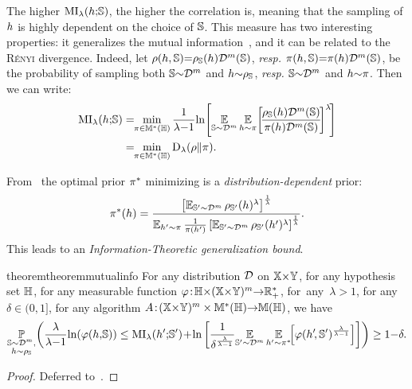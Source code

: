 \begin{noaddcontents}
The higher $\MI_{\lambda}(\h{;}\S)$, the higher the correlation is, meaning that the sampling of $\h$ is highly dependent on the choice of $\S$. 
This measure has two interesting properties: it generalizes the mutual information~\citep{Verdu2015}, and it can be related to the \textsc{Rényi} divergence.
Indeed, let $\rho(\h, \S){=} \AQ(\h)\D^{\m}(\S)$, \textit{resp.} $\pi(\h, \S){=} \P(\h)\D^{\m}(\S)$, be the probability of sampling both  $\S{\sim}\D^\m$ and  $\h{\sim}\AQ$, \textit{resp.}  $\S{\sim}\D^\m$ and $\h{\sim}\P$.
Then we can write: 
\begin{align}
\MI_{\lambda}(\h{;}\S) 
 &=\!\!\min_{\P\in\M^{*}(\H)} \frac{1}{\lambda{-}1}\!\ln\!\Bigg[\!\EE_{\S\sim\D^{\m}}\EE_{\h\sim \P}\!\LB\!\frac{\AQ(\h)\D^{\m}(\S)}{\P(\h)\D^{\m}(\S)}\!\RB^{\lambda}\!\!\Bigg]\nonumber\\
 &=\!\!\min_{\P\in\M^{*}(\H)} \Renyi_{\lambda}(\rho\|\pi).\label{chap:dis-pra:eq:mutual-info-min}
\end{align}

From~\citet{Verdu2015} the 
optimal prior $\P^*$ minimizing  is  a {\it distribution-dependent} prior: 
\begin{align*}
\displaystyle \P^*(\h)=\frac{\LB\EE_{\S'{\sim}\D^{\m}}\AQp (\h)^{\lambda}\RB^{\frac{1}{\lambda}}}{\EE_{\h'{\sim}\P}\tfrac{1}{\P(\h')}\LB\EE_{\S'{\sim}\D^{\m}}\AQp (\h')^{\lambda}\RB^{\frac{1}{\lambda}}}.
\end{align*}
This leads to an {\it Information-Theoretic generalization 
bound}.


\begin{restatable}{theorem}{theoremmutualinfo}\label{chap:dis-pra:theorem:mutual-info}
For any distribution $\D$ on $\X{\times}\Y$, for any hypothesis set $\H$, for any measurable function $\varphi\!:\!\H{\times} (\X{\times}\Y)^{\m}{\to}\Rbb_{+}^*$, \mbox{for any $\lambda\!>\!1$}, for any $\delta\in(0,1]$, for any algorithm $A\!:\!(\X{\times}\Y)^{\m}\times\M^{*}(\H){\rightarrow} \M(\H)$, we have
\begin{align*}
   \PP_{\substack{\S\sim\D^{\m},\\\h\sim \AQ}} \!\left(
   \frac{\lambda}{\lambda{-}1}\!\ln\!\LP\varphi(\h,\!\S)\RP \le \MI_{\lambda}(\h'{;} \S')\!+\!  \ln\left[\frac{1}{\delta^{\frac{\lambda}{\lambda{-}1}}}\!\EE_{\S'{\sim}\D^{\m}}\EE_{\h'{\sim} \P^*}\!\!\LB\varphi(\h'\!, \S')^{\frac{\lambda}{\lambda-1}}\RB\right] 
   \right)\ge 1{-}\delta.
\end{align*}
\end{restatable}
\begin{proof}
Deferred to~.
\end{proof}


\end{noaddcontents}
